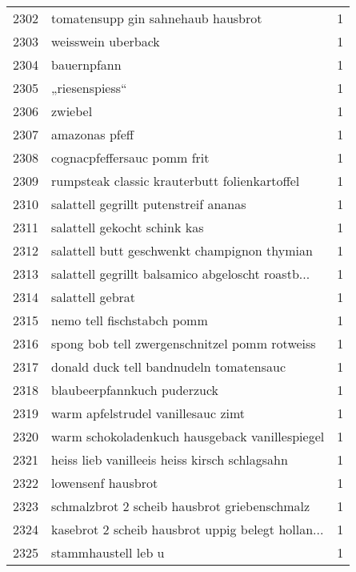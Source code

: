 \begin{tabular}{llr}
2302 &                 tomatensupp gin sahnehaub hausbrot &      1 \\
2303 &                                 weisswein uberback &      1 \\
2304 &                                        bauernpfann &      1 \\
2305 &                                     „riesenspiess“ &      1 \\
2306 &                                            zwiebel &      1 \\
2307 &                                     amazonas pfeff &      1 \\
2308 &                        cognacpfeffersauc pomm frit &      1 \\
2309 &      rumpsteak classic krauterbutt folienkartoffel &      1 \\
2310 &              salattell gegrillt putenstreif ananas &      1 \\
2311 &                       salattell gekocht schink kas &      1 \\
2312 &       salattell butt geschwenkt champignon thymian &      1 \\
2313 &  salattell gegrillt balsamico abgeloscht roastb... &      1 \\
2314 &                                   salattell gebrat &      1 \\
2315 &                         nemo tell fischstabch pomm &      1 \\
2316 &      spong bob tell zwergenschnitzel pomm rotweiss &      1 \\
2317 &            donald duck tell bandnudeln tomatensauc &      1 \\
2318 &                        blaubeerpfannkuch puderzuck &      1 \\
2319 &                 warm apfelstrudel vanillesauc zimt &      1 \\
2320 &     warm schokoladenkuch hausgeback vanillespiegel &      1 \\
2321 &      heiss lieb vanilleeis heiss kirsch schlagsahn &      1 \\
2322 &                                 lowensenf hausbrot &      1 \\
2323 &       schmalzbrot 2 scheib hausbrot griebenschmalz &      1 \\
2324 &  kasebrot 2 scheib hausbrot uppig belegt hollan... &      1 \\
2325 &                                stammhaustell leb u &      1 \\

\end{tabular}
